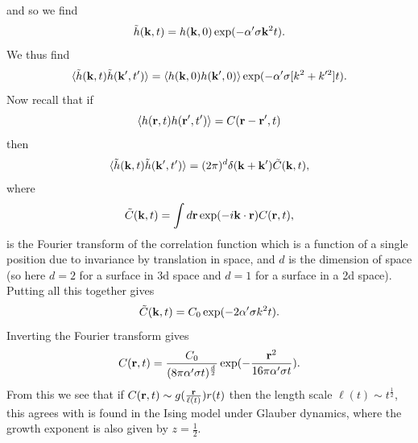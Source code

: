 and so we find
\begin{equation}
\tilde h({\bf k},t) = h({\bf k},0)\exp(-\alpha'\sigma{\bf k}^2 t).
\end{equation}
We thus find 
\begin{equation}
\langle \tilde h({\bf k},t)\tilde h({\bf k}',t')\rangle = \langle h({\bf k},0)h({\bf k}',0)\rangle \exp(-\alpha'\sigma[k^2+k'^2] t).
\end{equation}
Now recall that if 
\begin{equation}
\langle  h({\bf r},t) h({\bf r}',t')\rangle =C({\bf r}-{\bf r}',t)
\end{equation}
then
\begin{equation}
\langle \tilde h({\bf k},t)\tilde h({\bf k}',t')\rangle= (2\pi)^d \delta({\bf k}+{\bf k}') \tilde C({\bf k},t),
\end{equation}
where 
\begin{equation}
\tilde C({\bf k},t)= \int d{\bf r} \exp(-i{\bf k}\cdot {\bf r})C({\bf r},t),
\end{equation}
is the Fourier transform of the correlation function which is a function of a single position due to invariance by translation in space, and $d$ is the dimension of space (so here $d=2$ for a surface in 3d space and $d=1$ for a surface in a 2d space). Putting all this together gives
\begin{equation}
\tilde C({\bf k},t)= C_0 \exp(-2\alpha'\sigma k^2 t).
\end{equation}
Inverting the Fourier transform gives
\begin{equation}
C({\bf r},t)= \frac{C_0}{(8\pi \alpha'\sigma t)^{\frac{d}{2}}} \exp(-\frac{{\bf r}^2}{16\pi \alpha'\sigma t}).
\end{equation}
From this we see that if $C({\bf r},t)\sim g(\frac{{\bf r}}{\ell(t)})r(t)$ then the length scale $\ell(t)\sim t^{\frac{1}{2}}$, this agrees with is found in the Ising model under Glauber dynamics, where the growth exponent is also given by $z=\frac{1}{2}$.
\\


